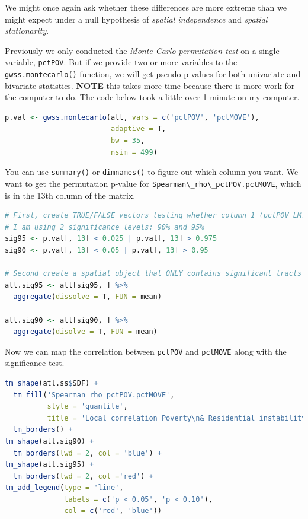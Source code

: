 \documentclass[
]{book}
\newcommand{\passthrough}[1]{#1}
\begin{document}
We might once again ask whether these differences are more extreme than we might expect under a null hypothesis of \emph{spatial independence} and \emph{spatial stationarity}.

Previously we only conducted the \emph{Monte Carlo permutation test} on a single variable, \passthrough{\lstinline!pctPOV!}. But if we provide two or more variables to the \passthrough{\lstinline!gwss.montecarlo()!} function, we will get pseudo p-values for both univariate and bivariate statistics. \textbf{NOTE} this takes more time because there is more work for the computer to do. The code below took a little over 1-minute on my computer.

\begin{lstlisting}[language=R]
p.val <- gwss.montecarlo(atl, vars = c('pctPOV', 'pctMOVE'), 
                         adaptive = T,
                         bw = 35,
                         nsim = 499)
\end{lstlisting}

You can use \passthrough{\lstinline!summary()!} or \passthrough{\lstinline!dimnames()!} to figure out which column you want. We want to get the permutation p-value for \passthrough{\lstinline!Spearman\_rho\_pctPOV.pctMOVE!}, which is in the 13th column of the matrix.

\begin{lstlisting}[language=R]
# First, create TRUE/FALSE vectors testing whether column 1 (pctPOV_LM) is extreme
# I am using 2 significance levels: 90% and 95%
sig95 <- p.val[, 13] < 0.025 | p.val[, 13] > 0.975
sig90 <- p.val[, 13] < 0.05 | p.val[, 13] > 0.95

# Second create a spatial object that ONLY contains significant tracts
atl.sig95 <- atl[sig95, ] %>% 
  aggregate(dissolve = T, FUN = mean) 

atl.sig90 <- atl[sig90, ] %>%
  aggregate(disolve = T, FUN = mean)
\end{lstlisting}

Now we can map the correlation between \passthrough{\lstinline!pctPOV!} and \passthrough{\lstinline!pctMOVE!} along with the significance test.

\begin{lstlisting}[language=R]
tm_shape(atl.ss$SDF) + 
  tm_fill('Spearman_rho_pctPOV.pctMOVE', 
          style = 'quantile',
          title = 'Local correlation Poverty\n& Residential instability') + 
  tm_borders() + 
tm_shape(atl.sig90) +
  tm_borders(lwd = 2, col = 'blue') + 
tm_shape(atl.sig95) + 
  tm_borders(lwd = 2, col ='red') +
tm_add_legend(type = 'line',
              labels = c('p < 0.05', 'p < 0.10'),
              col = c('red', 'blue'))
\end{lstlisting}
\end{document}
